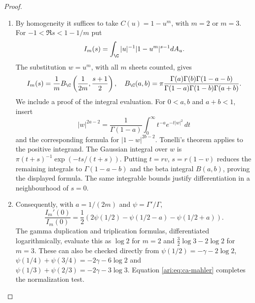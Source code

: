 \begin{proof}
\begin{enumerate}[label=\arabic*.,leftmargin=*]
\item By homogeneity it suffices to take $C(u)=1-u^m$, with $m=2$
or $m=3$. For $-1<\Re s<1-1/m$ put
\[
 I_m(s)=\int_{\C} |u|^{-1}|1-u^m|^{s-1}dA_u.
\]
The substitution $w=u^m$, with all $m$ sheets counted, gives
\[
 I_m(s)=\frac1m B_{\C}\left(\frac1{2m},\frac{s+1}2\right),
 \quad
 B_{\C}(a,b)=\pi\frac{\Gamma(a)\Gamma(b)\Gamma(1-a-b)}
                   {\Gamma(1-a)\Gamma(1-b)\Gamma(a+b)}.
\]
We include a proof of the integral evaluation. For
$0<a,b$ and $a+b<1$, insert
\[
 |w|^{2a-2}=\frac1{\Gamma(1-a)}
       \int_0^\infty t^{-a}e^{-t|w|^2}\,dt
\]
and the corresponding formula for $|1-w|^{2b-2}$.
Tonelli's theorem applies to the positive integrand. The
Gaussian integral over $w$ is
$\pi(t+s)^{-1}\exp(-ts/(t+s))$.
Putting $t=rv$, $s=r(1-v)$ reduces the remaining integrals
to $\Gamma(1-a-b)$ and the beta integral $B(a,b)$, proving
the displayed formula. The same integrable bounds justify
differentiation in a neighbourhood of $s=0$.

\item Consequently, with $a=1/(2m)$ and $\psi=\Gamma'/\Gamma$,
\[
 \frac{I_m'(0)}{I_m(0)}
 =\frac12\left(2\psi(1/2)-\psi(1/2-a)-\psi(1/2+a)\right).
\]
The gamma duplication and triplication formulas, differentiated
logarithmically, evaluate this as $\log2$ for $m=2$ and
$\frac32\log3-2\log2$ for $m=3$. These can also be checked
directly from
$\psi(1/2)=-\gamma-2\log2$,
$\psi(1/4)+\psi(3/4)=-2\gamma-6\log2$ and
$\psi(1/3)+\psi(2/3)=-2\gamma-3\log3$.
Equation \eqref{ari:eq:ca-mahler} completes the normalization test.
\end{enumerate}
\end{proof}


